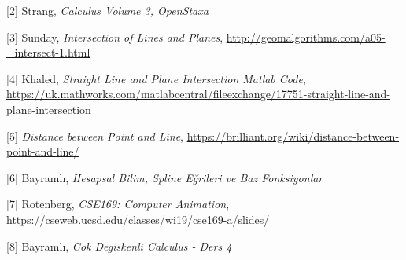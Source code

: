 \documentclass[12pt,fleqn]{article}\usepackage{../../common}
\begin{document}
[2] Strang, {\em Calculus Volume 3, OpenStaxa}

[3] Sunday, {\em Intersection of Lines and Planes}, 
\url{http://geomalgorithms.com/a05-_intersect-1.html}

[4] Khaled, {\em Straight Line and Plane Intersection Matlab Code}, 
\url{https://uk.mathworks.com/matlabcentral/fileexchange/17751-straight-line-and-plane-intersection}

[5] {\em Distance between Point and Line}, 
\url{https://brilliant.org/wiki/distance-between-point-and-line/}

[6] Bayramlı, {\em Hesapsal Bilim, Spline Eğrileri ve Baz Fonksiyonlar}

[7] Rotenberg, {\em CSE169: Computer Animation},
    \url{https://cseweb.ucsd.edu/classes/wi19/cse169-a/slides/}

[8] Bayramlı, {\em Cok Degiskenli Calculus - Ders 4}
    
\end{document}
